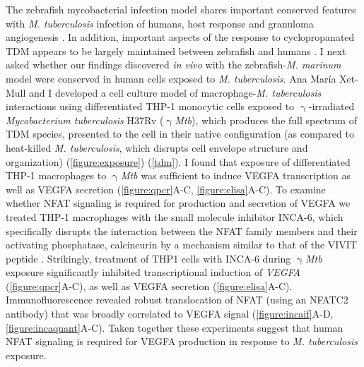 The zebrafish mycobacterial infection model shares important conserved features with \textit{M. tuberculosis} infection of humans, host response and granuloma angiogenesis \citep{Swaim2006, Datta2015, Oehlers2015, Cronan2021, Cronan2016}. In addition, important aspects of the response to cyclopropanated TDM appears to be largely maintained between zebrafish and humans \citep{Walton2018, Rao2005}. I next asked whether our findings discovered \textit{in vivo} with the zebrafish\hyp{}\textit{M. marinum} model were conserved in human cells exposed to \textit{M. tuberculosis}. Ana Mar\'{i}a Xet-Mull and I developed a cell culture model of macrophage\hyp{}\textit{M. tuberculosis} interactions using differentiated THP\hyp{}1 monocytic cells exposed to $\upgamma$\hyp{}irradiated \textit{Mycobacterium tuberculosis} H37Rv ($\upgamma$\textit{Mtb}), which produces the full spectrum of TDM species, presented to the cell in their native configuration (as compared to heat\hyp{}killed \textit{M. tuberculosis}, which disrupts cell envelope structure and organization) \citep{Romero2014, SecanellaFandos2014} (\autoref{figure:exposure}) (\autoref{tdm}). I found that exposure of differentiated THP\hyp{}1 macrophages to $\upgamma$\textit{Mtb} was sufficient to induce VEGFA transcription as well as VEGFA secretion (\autoref{figure:qpcr}A\hyp{}C, \autoref{figure:elisa}A\hyp{}C). To examine whether NFAT signaling is required for production and secretion of VEGFA we treated THP\hyp{}1 macrophages with the small molecule inhibitor INCA\hyp{}6, which specifically disrupts the interaction between the NFAT family members and their activating phosphatase, calcineurin by a mechanism similar to that of the VIVIT peptide \citep{Roehrl2004a, Roehrl2004b}. Strikingly, treatment of THP1 cells with INCA\hyp{}6 during $\upgamma$\textit{Mtb} exposure significantly inhibited transcriptional induction of \textit{VEGFA} (\autoref{figure:qpcr}A\hyp{}C), as well as VEGFA secretion (\autoref{figure:elisa}A\hyp{}C). Immunofluorescence revealed robust translocation of NFAT (using an NFATC2 antibody) that was broadly correlated to VEGFA signal (\autoref{figure:incaif}A\hyp{}D, \autoref{figure:incaquant}A\hyp{}C). Taken together these experiments suggest that human NFAT signaling is required for VEGFA production in response to \textit{M. tuberculosis} exposure.

